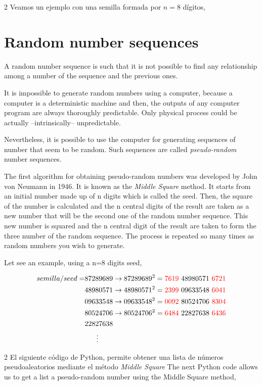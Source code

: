 \begin{paracol}{2}
Veamos un ejemplo con una semilla  formada por $n=8$ dígitos,
\switchcolumn
\section{Random number sequences}
A random number sequence is such that it is not possible to find any relationship among a number of the sequence and the previous ones.

It is impossible to generate random numbers using a computer, because a computer is a deterministic machine and then, the outputs of any computer program are always thoroughly predictable. Only physical process could be actually --intrinsically-- unpredictable.

Nevertheless, it is possible to use the computer for generating sequences of number that seem to be random. Such sequences are called \emph{pseudo-random} number sequences.

The first algorithm for obtaining pseudo-random numbers was developed by John von Neumann in 1946. It is known as the \emph{Middle Square} method. It starts from an initial number made up of n digits which is called the seed. Then, the square of the number is calculated and the n central digits of the result are taken as a new number that will be the second one of the random number sequence. This new number is squared and the n central digit of the result are taken to form the three number of the random sequence. The process is repeated so many times as random numbers you wish to generate.

Let see an example, using a n=8 digits seed, 

\end{paracol}
\begin{align*}
semilla/seed=&87289689 \rightarrow
87289689^2={\color{red}7619}\ 48980571\ {\color{red}6721}\\
&48980571\rightarrow
48980571^2={\color{red}2399}\ 09633548\ {\color{red}6041}\\
&09633548 \rightarrow
09633548^2={\color{red}0092}\ 80524706\ {\color{red}8304}\\
&80524706 \rightarrow
80524706^2={\color{red}6484}\ 22827638\ {\color{red}6436}\\
&22827638\\
&\ \ \ \ \ \vdots
\end{align*}
\begin{paracol}{2}
El siguiente código de Python, permite obtener una lista de números pseudoaleatorios mediante el método \emph{Middle Square}
\switchcolumn
The next Python code allows us to get a list a pseudo-random number using the Middle Square method,
\end{paracol}

